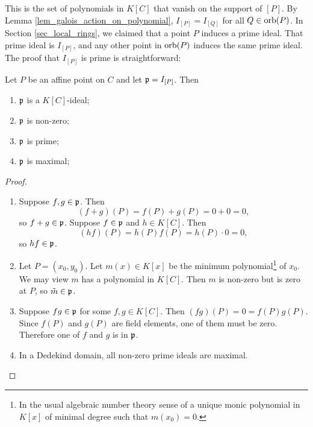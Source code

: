 This is the set of polynomials in $K[C]$ that vanish on the support of $[P]$.
By Lemma \ref{lem_galois_action_on_polynomial}, $I_{[P]} = I_{[Q]}$ for all $Q \in \operatorname{orb}(P)$.
In Section \ref{sec_local_rings}, we claimed that a point $P$ induces a prime ideal.
That prime ideal is $I_{[P]}$, and any other point in $\operatorname{orb}(P)$ induces the same prime ideal.
The proof that $I_{[P]}$ is prime is straightforward:

\begin{proposition}
  \label{prop_I_P_is_prime}
  Let $P$ be an affine point on $C$ and let $\frak p = I_{[P]}$. Then
  \begin{enumerate}[label=(\roman*)]
    \item $\frak p$ is a $K[C]$-ideal;
    \item $\frak p$ is non-zero;
    \item $\frak p$ is prime;
    \item $\frak p$ is maximal;
  \end{enumerate}
\end{proposition}
\begin{proof}
  \begin{enumerate}[label=(\roman*)]
    \item
    Suppose $f, g \in \frak p$. Then
      \[ (f + g)(P) = f(P) + g(P) = 0 + 0 = 0, \]
    so $f + g \in \frak p$.
    Suppose $f \in \frak p$ and $h \in K[C]$. Then
      \[ (hf)(P) = h(P)f(P) = h(P)\cdot 0 = 0, \]
    so $hf \in \frak p$.
    
    \item
    Let $P = (x_0, y_0)$.
    Let $m(x) \in K[x]$ be the minimum polynomial\footnote{
    In the usual algebraic number theory sense of a unique monic polynomial in $K[x]$
    of minimal degree such that $m(x_0) = 0$.}
    of $x_0$.
    We may view $m$ has a polynomial in $K[C]$.
    Then $m$ is non-zero but is zero at $P$, so $\tilde m \in \frak p$.
    
    \item
    Suppose $fg \in \frak p$ for some $f, g \in K[C]$.
    Then $(fg)(P) = 0 = f(P)g(P)$.
    Since $f(P)$ and $g(P)$ are field elements, one of them must be zero.
    Therefore one of $f$ and $g$ is in $\frak p$.
    
    \item
    In a Dedekind domain, all non-zero prime ideals are maximal.\qedhere
  \end{enumerate}
\end{proof}

